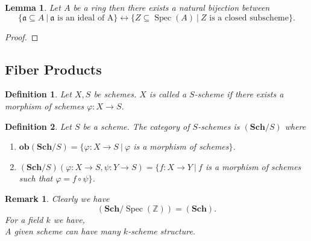 \documentclass{article}
\newtheorem{definition}{Definition}[section]
\newtheorem{lemma}{Lemma}[section]
\newtheorem{remark}{Remark}[section]
\numberwithin{equation}{section}
\DeclareMathOperator{\Spec}{Spec}
\begin{document}
\begin{lemma}
Let $A$ be a ring then there exists a natural bijection between 
\begin{equation*}
\{\mathfrak{a}\subseteq A\:|\:\mathfrak{a}\text{ is an ideal of A}\}\leftrightarrow\{Z\subseteq\Spec(A)\:|\:Z \text{ is a closed subscheme}\}.
\end{equation*}
\end{lemma}

\begin{proof}
\end{proof}

\subsection{Fiber Products}

\begin{definition}
Let $X,S$ be schemes. $X$ is called a $S$-scheme if there exists a morphism of schemes $\varphi:X\to S$. 
\end{definition}

\begin{definition}
Let $S$ be a scheme. The category of $S$-schemes is $(\mathbf{Sch}/S)$ where
\begin{enumerate}
\item $\mathbf{ob}(\mathbf{Sch}/S) = \{\varphi:X\to S\:|\: \varphi$ is a morphism of schemes$\}$.
\item $(\mathbf{Sch}/S)(\varphi:X\to S,\psi:Y\to S) = \{f:X\to Y\:|\: f$ is a morphism of schemes such that $\varphi=f\circ\psi\}$. 
\end{enumerate}
\end{definition}

\begin{remark}
Clearly we have
\begin{equation*}
(\mathbf{Sch}/\Spec(\mathbb{Z}))=(\mathbf{Sch}).
\end{equation*}
For a field $k$ we have,
\begin{equation*}
\end{equation*}
A given scheme can have many $k$-scheme structure.%
\end{remark}
\end{document}
